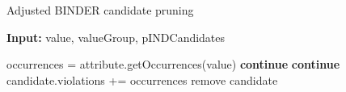 \begin{algorithm}
    \caption{Adjusted BINDER candidate pruning}\label{alg:BINDER_prune}
    \hspace*{\algorithmicindent} \textbf{Input:} value, valueGroup, pINDCandidates
    \begin{algorithmic}[1]
        \State occurrences = attribute.getOccurrences(value)
                \State \textbf{continue}
            \EndIf
                \State \textbf{continue}
            \EndIf
            \State candidate.violations += occurrences
                \State remove candidate
            \EndIf
        \EndFor
    \EndFor
    \end{algorithmic}
\end{algorithm}




